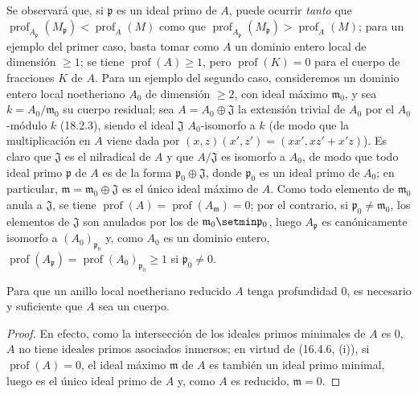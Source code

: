 \begin{env}[16.4.6.4]
\label{0.16.4.6.4-es}
Se observará que, si $\mathfrak{p}$ es un ideal primo de $A$, puede ocurrir
\emph{tanto} que
$\operatorname{prof}_{A_{\mathfrak{p}}}(M_{\mathfrak{p}})
<\operatorname{prof}_A(M)$ como que
$\operatorname{prof}_{A_{\mathfrak{p}}}(M_{\mathfrak{p}})
>\operatorname{prof}_A(M)$; para un ejemplo del primer caso,
basta tomar como $A$ un dominio entero local de dimensión $\geq1$; se tiene
$\operatorname{prof}(A)\geq1$, pero $\operatorname{prof}(K)=0$ para el cuerpo
de fracciones $K$ de $A$. Para un ejemplo del segundo caso, consideremos un
dominio entero local noetheriano $A_0$ de dimensión $\geq2$, con ideal máximo
$\mathfrak{m}_0$, y sea $k=A_0/\mathfrak{m}_0$ su cuerpo residual; sea
$A=A_0\oplus\mathfrak{J}$ la extensión trivial de $A_0$ por el $A_0$-módulo
$k$ (18.2.3), siendo el ideal $\mathfrak{J}$ $A_0$-isomorfo a $k$ (de modo que
la multiplicación en $A$ viene dada por
$(x,z)(x',z')=(xx',xz'+x'z)$). Es claro que $\mathfrak{J}$ es el nilradical de
$A$ y que $A/\mathfrak{J}$ es isomorfo a $A_0$, de modo que todo ideal primo
$\mathfrak{p}$ de $A$ es de la forma
$\mathfrak{p}_0\oplus\mathfrak{J}$, donde $\mathfrak{p}_0$ es un ideal primo
de $A_0$; en particular, $\mathfrak{m}=\mathfrak{m}_0\oplus\mathfrak{J}$ es el
único ideal máximo de $A$. Como todo elemento de $\mathfrak{m}_0$ anula a
$\mathfrak{J}$, se tiene
$\operatorname{prof}(A)=\operatorname{prof}(A_{\mathfrak{m}})=0$; por el
contrario, si $\mathfrak{p}_0\neq\mathfrak{m}_0$, los elementos de
$\mathfrak{J}$ son anulados por los de
$\mathfrak m_0\setmin\mathfrak{p}_0$, luego $A_{\mathfrak{p}}$ es canónicamente
isomorfo a $(A_0)_{\mathfrak{p}_0}$ y, como $A_0$ es un dominio entero,
$\operatorname{prof}(A_{\mathfrak{p}})
=\operatorname{prof}(A_0)_{\mathfrak p_0}\geq1$ si
$\mathfrak{p}_0\neq0$.
\end{env}

\begin{corollary}[16.4.7]
\label{0.16.4.7-es}
Para que un anillo local noetheriano reducido $A$ tenga profundidad $0$, es
necesario y suficiente que $A$ sea un cuerpo.
\end{corollary}

\begin{proof}
En efecto, como la intersección de los ideales primos minimales de $A$ es $0$,
$A$ no tiene ideales primos asociados inmersos; en virtud de (16.4.6, (i)), si
$\operatorname{prof}(A)=0$, el ideal máximo $\mathfrak{m}$ de $A$ es también
un ideal primo minimal, luego es el único ideal primo de $A$ y, como $A$ es
reducido, $\mathfrak{m}=0$.
\end{proof}

